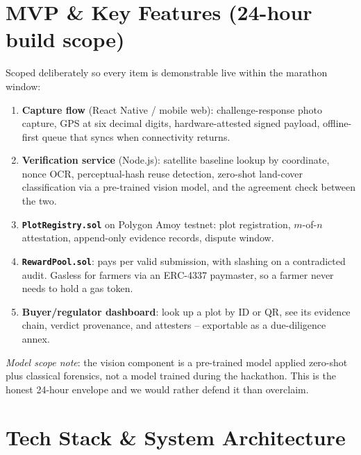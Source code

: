 \documentclass[11pt]{article}
\begin{document}
\section{MVP \& Key Features (24-hour build scope)}
Scoped deliberately so every item is demonstrable live within the marathon window:
\begin{enumerate}[leftmargin=1.4em]
  \item \textbf{Capture flow} (React Native / mobile web): challenge-response photo capture, GPS at six decimal digits, hardware-attested signed payload, offline-first queue that syncs when connectivity returns.
  \item \textbf{Verification service} (Node.js): satellite baseline lookup by coordinate, nonce OCR, perceptual-hash reuse detection, zero-shot land-cover classification via a pre-trained vision model, and the agreement check between the two.
  \item \textbf{\texttt{PlotRegistry.sol}} on Polygon Amoy testnet: plot registration, $m$-of-$n$ attestation, append-only evidence records, dispute window.
  \item \textbf{\texttt{RewardPool.sol}}: pays per valid submission, with slashing on a contradicted audit. Gasless for farmers via an ERC-4337 paymaster, so a farmer never needs to hold a gas token.
  \item \textbf{Buyer/regulator dashboard}: look up a plot by ID or QR, see its evidence chain, verdict provenance, and attesters -- exportable as a due-diligence annex.
\end{enumerate}

\noindent\textit{Model scope note}: the vision component is a pre-trained model applied zero-shot plus classical forensics, not a model trained during the hackathon. This is the honest 24-hour envelope and we would rather defend it than overclaim.

\section{Tech Stack \& System Architecture}
\end{document}
